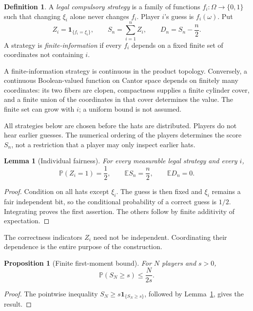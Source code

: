 \documentclass[11pt,letterpaper]{article}
\newtheorem{lemma}[theorem]{Lemma}
\newtheorem{proposition}[theorem]{Proposition}
\theoremstyle{definition}
\newtheorem{definition}[theorem]{Definition}
\newcommand{\E}{\mathbb E}
\newcommand{\Prb}{\mathbb P}
\newcommand{\ind}{\mathbf 1}
\begin{document}
\begin{definition}
A \emph{legal compulsory strategy} is a family of functions
\(f_i:\Omega\to\{0,1\}\) such that changing \(\xi_i\) alone never changes
\(f_i\). Player \(i\)'s guess is \(f_i(\omega)\). Put
\[
  Z_i=\ind_{\{f_i=\xi_i\}},\qquad
  S_n=\sum_{i=1}^n Z_i,\qquad D_n=S_n-\frac n2.
\]
A strategy is \emph{finite-information} if every \(f_i\) depends on a
fixed finite set of coordinates not containing \(i\).
\end{definition}

A finite-information strategy is continuous in the product topology.
Conversely, a continuous Boolean-valued function on Cantor space
depends on finitely many coordinates: its two fibers are clopen,
compactness supplies a finite cylinder cover, and a finite union of
the coordinates in that cover determines the value.
The finite set can grow with \(i\); a uniform bound is not assumed.

All strategies below are chosen before the hats are distributed.
Players do not hear earlier guesses. The numerical ordering of the
players determines the score \(S_n\), not a restriction that a player
may only inspect earlier hats.

\begin{lemma}[Individual fairness]\label{mbg:hat:lem:fair}
For every measurable legal strategy and every \(i\),
\[
  \Prb(Z_i=1)=\frac12,\qquad \E S_n=\frac n2,\qquad \E D_n=0.
\]
\end{lemma}
\begin{proof}
Condition on all hats except \(\xi_i\). The guess is then fixed and
\(\xi_i\) remains a fair independent bit, so the conditional probability
of a correct guess is \(1/2\). Integrating proves the first assertion.
The others follow by finite additivity of expectation.
\end{proof}

The correctness indicators \(Z_i\) need not be independent.
Coordinating their dependence is the entire purpose of the construction.

\begin{proposition}[Finite first-moment bound]\label{mbg:hat:prop:markov}
For \(N\) players and \(s>0\),
\[
  \Prb(S_N\ge s)\le \frac{N}{2s}.
\]
\end{proposition}
\begin{proof}
The pointwise inequality \(S_N\ge s\ind_{\{S_N\ge s\}}\), followed by
Lemma~\ref{mbg:hat:lem:fair}, gives the result.
\end{proof}
\end{document}
